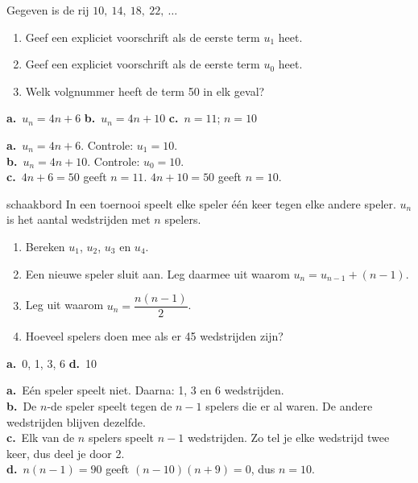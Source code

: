 \begin{oefeningen}
\begin{oefening}[2]\label{oef:h1-nuleen}
Gegeven is de rij $10,\ 14,\ 18,\ 22,\ \ldots$
\begin{enumerate}
  \item Geef een expliciet voorschrift als de eerste term $u_1$ heet.
  \item Geef een expliciet voorschrift als de eerste term $u_0$ heet.
  \item Welk volgnummer heeft de term 50 in elk geval?
\end{enumerate}
\begin{solution}
\textbf{a.}~$u_n=4n+6$ \quad \textbf{b.}~$u_n=4n+10$ \quad \textbf{c.}~$n=11$; $n=10$
\end{solution}
\begin{fullsolution}
\textbf{a.}~$u_n=4n+6$. Controle: $u_1=10$.\\
\textbf{b.}~$u_n=4n+10$. Controle: $u_0=10$.\\
\textbf{c.}~$4n+6=50$ geeft $n=11$. $4n+10=50$ geeft $n=10$.
\end{fullsolution}
\end{oefening}

\begin{oefening}[2]
\begin{metprent}{schaakbord}
In een toernooi speelt elke speler één keer tegen elke andere speler. $u_n$ is het aantal wedstrijden met $n$ spelers.
\begin{enumerate}
  \item Bereken $u_1$, $u_2$, $u_3$ en $u_4$.
  \item Een nieuwe speler sluit aan. Leg daarmee uit waarom \mbox{$u_n = u_{n-1} + (n-1)$}.
  \item Leg uit waarom $u_n = \dfrac{n(n-1)}{2}$.
  \item Hoeveel spelers doen mee als er 45 wedstrijden zijn?
\end{enumerate}
\end{metprent}
\begin{solution}
\textbf{a.}~0, 1, 3, 6 \quad \textbf{d.}~10
\end{solution}
\begin{fullsolution}
\textbf{a.}~Eén speler speelt niet. Daarna: 1, 3 en 6 wedstrijden.\\
\textbf{b.}~De $n$-de speler speelt tegen de $n-1$ spelers die er al waren. De andere wedstrijden blijven dezelfde.\\
\textbf{c.}~Elk van de $n$ spelers speelt $n-1$ wedstrijden. Zo tel je elke wedstrijd twee keer, dus deel je door 2.\\
\textbf{d.}~$n(n-1)=90$ geeft $(n-10)(n+9)=0$, dus $n=10$.
\end{fullsolution}
\end{oefening}


\end{oefeningen}
